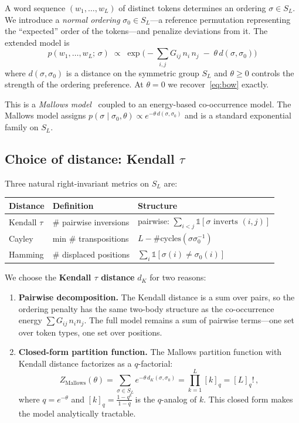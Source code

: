 \documentclass[11pt]{article}
\begin{document}
A word sequence $(w_1, \ldots, w_L)$ of distinct tokens determines an ordering $\sigma \in S_L$. We introduce a \emph{normal ordering} $\sigma_0 \in S_L$---a reference permutation representing the ``expected'' order of the tokens---and penalize deviations from it. The extended model is
\begin{equation}\label{eq:mallows-bow}
    \boxed{\;p(w_1, \ldots, w_L;\, \sigma) \;\propto\; \exp\!\Big(-\sum_{i,j} G_{ij}\, n_i\, n_j \;-\; \theta\, d(\sigma, \sigma_0)\Big)\;}
\end{equation}
where $d(\sigma, \sigma_0)$ is a distance on the symmetric group $S_L$ and $\theta \geq 0$ controls the strength of the ordering preference. At $\theta = 0$ we recover~\eqref{eq:bow} exactly.

This is a \emph{Mallows model}~\cite{mallows1957} coupled to an energy-based co-occurrence model. The Mallows model assigns $p(\sigma \mid \sigma_0, \theta) \propto e^{-\theta\, d(\sigma, \sigma_0)}$ and is a standard exponential family on $S_L$.

\subsection{Choice of distance: Kendall $\tau$}

Three natural right-invariant metrics on $S_L$ are:

\begin{table}[h]
\centering
\begin{tabular}{@{}lll@{}}
\toprule
\textbf{Distance} & \textbf{Definition} & \textbf{Structure} \\
\midrule
Kendall $\tau$ & \# pairwise inversions & pairwise: $\sum_{i<j} \mathbb{1}[\sigma \text{ inverts } (i,j)]$ \\
Cayley & min \# transpositions & $L - \#\text{cycles}(\sigma\sigma_0^{-1})$ \\
Hamming & \# displaced positions & $\sum_i \mathbb{1}[\sigma(i) \neq \sigma_0(i)]$ \\
\bottomrule
\end{tabular}
\end{table}

We choose the \textbf{Kendall $\tau$ distance} $d_K$ for two reasons:
\begin{enumerate}
    \item \textbf{Pairwise decomposition.} The Kendall distance is a sum over pairs, so the ordering penalty has the same two-body structure as the co-occurrence energy $\sum G_{ij}\, n_i n_j$. The full model remains a sum of pairwise terms---one set over token types, one set over positions.
    \item \textbf{Closed-form partition function.} The Mallows partition function with Kendall distance factorizes as a $q$-factorial:
    \begin{equation}\label{eq:mallows-Z}
        Z_{\text{Mallows}}(\theta) = \sum_{\sigma \in S_L} e^{-\theta\, d_K(\sigma, \sigma_0)} = \prod_{k=1}^{L} [k]_q = [L]_q!\,,
    \end{equation}
    where $q = e^{-\theta}$ and $[k]_q = \frac{1 - q^k}{1 - q}$ is the $q$-analog of $k$. This closed form makes the model analytically tractable.
\end{enumerate}
\end{document}
